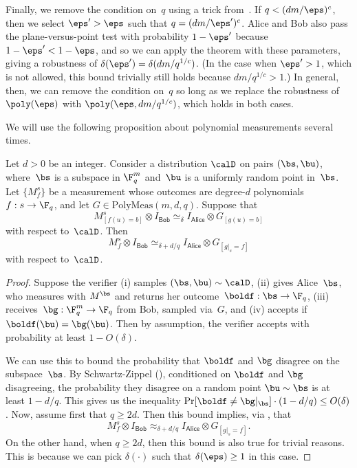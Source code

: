 \documentclass[11pt]{article}
\newcommand{\consistency}{\simeq}
\newcommand{\polymeas}[3]{\mathrm{PolyMeas}(#1,#2,#3)}
\newcommand{\reg}[1]{{\mathsf{#1}}}
\begin{document}
\begin{remark}
Finally, we remove the condition on~$q$ using a trick from~\cite{NV18a}. If $q < (dm/\eps)^c$, then we select $\eps' > \eps$ such that $q = (dm/\eps')^c$.
Alice and Bob also pass the plane-versus-point test with probability $1-\eps'$ because $1-\eps' < 1-\eps$, and so we can apply the theorem with these parameters,
giving a robustness of $\delta(\eps') = \delta(dm/q^{1/c})$.
(In the case when $\eps' > 1$, which is not allowed, this bound trivially still holds because $dm/q^{1/c} > 1$.)
In general, then, we can remove the condition on~$q$ so long as we replace the robustness of $\poly(\eps)$ with $\poly(\eps, dm/q^{1/c})$, which holds in both cases.
\end{remark}

We will use the following proposition about polynomial measurements several times.

\begin{proposition}\label{prop:same-on-point-same-on-subspace}
Let $d > 0$ be an integer.
Consider a distribution $\calD$ on pairs $(\bs, \bu)$, where~$\bs$ is a subspace in $\F_q^m$ and~$\bu$ is a uniformly random point in~$\bs$.
Let $\{M^s_f\}$ be a measurement whose outcomes are degree-$d$ polynomials $f:s \rightarrow \F_q$,
and let $G \in \polymeas{m}{d}{q}$.
Suppose that
\begin{equation*}
M^s_{[f(u) = b]} \otimes I_{\reg{Bob}} \consistency_\delta I_{\reg{Alice}} \otimes G_{[g(u) = b]}
\end{equation*}
with respect to~$\calD$. Then
\begin{equation*}
M^s_{f} \otimes I_{\reg{Bob}} \consistency_{\delta+d/q} I_{\reg{Alice}} \otimes G_{[g|_s = f]}
\end{equation*}
with respect to~$\calD$.
\end{proposition}
\begin{proof}
Suppose the verifier (i)  samples $(\bs, \bu) \sim \calD$,
(ii) gives Alice~$\bs$, who measures with $M^{\bs}$ and returns her outcome~$\boldf : \bs \rightarrow \F_q$,
(iii) receives~$\bg : \F_q^m \rightarrow \F_q$ from Bob, sampled via~$G$,
and (iv) accepts if $\boldf(\bu) = \bg(\bu)$.
Then by assumption, the verifier accepts with probability at least $1-O(\delta)$.

We can use this to bound the probability that $\boldf$ and $\bg$ disagree on the subspace~$\bs$.
By Schwartz-Zippel (), conditioned on $\boldf$ and $\bg$ disagreeing,
the probability they disagree on a random point $\bu \sim \bs$  is at least $1-d/q$.
This gives us the inequality $\Pr[\boldf \neq \bg|_{\bs}] \cdot (1-d/q) \leq O(\delta)$.
Now, assume first that $q \geq 2d$. Then this bound implies, via , that
\begin{equation}\label{eq:almost-there-almost-there}
M^s_f \otimes I_{\reg{Bob}} \approx_{\delta + d/q} I_{\reg{Alice}} \otimes G_{[g|_{s} = f]}.
\end{equation}
On the other hand, when $q \geq 2d$, then this bound is also true for trivial reasons.
This is because we can pick $\delta(\cdot)$ such that $\delta(\eps) \geq 1$ in this case.
\end{proof}
\end{document}

